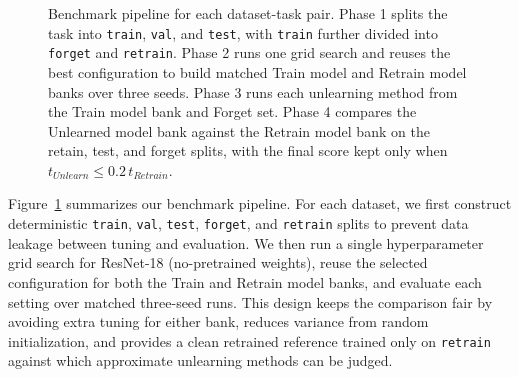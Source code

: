 \documentclass{article}
\begin{document}
\begin{figure}[htbp]
{%
    }
    \caption{Benchmark pipeline for each dataset-task pair. Phase 1 splits the task into \texttt{train}, \texttt{val}, and \texttt{test}, with \texttt{train} further divided into \texttt{forget} and \texttt{retrain}. Phase 2 runs one grid search and reuses the best configuration to build matched Train model and Retrain model banks over three seeds. Phase 3 runs each unlearning method from the Train model bank and Forget set. Phase 4 compares the Unlearned model bank against the Retrain model bank on the retain, test, and forget splits, with the final score kept only when $t_{Unlearn} \leq 0.2\,t_{Retrain}$.}
\label{fig:pipeline}
\end{figure}

Figure~\ref{fig:pipeline} summarizes our benchmark pipeline. For each dataset, we first construct deterministic \texttt{train}, \texttt{val}, \texttt{test}, \texttt{forget}, and \texttt{retrain} splits to prevent data leakage between tuning and evaluation. We then run a single hyperparameter grid search for ResNet-18 (no-pretrained weights), reuse the selected configuration for both the Train and Retrain model banks, and evaluate each setting over matched three-seed runs. This design keeps the comparison fair by avoiding extra tuning for either bank, reduces variance from random initialization, and provides a clean retrained reference trained only on \texttt{retrain} against which approximate unlearning methods can be judged.


\end{document}
